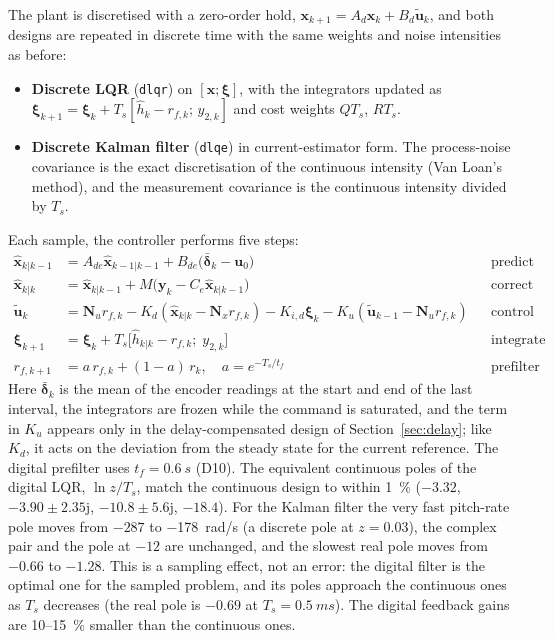 \documentclass[11pt,a4paper]{article}
\begin{document}
The plant is discretised with a zero-order hold,
$\bm x_{k+1}=A_d\bm x_k+B_d\tilde{\bm u}_k$, and both designs are repeated in
discrete time with the same weights and noise intensities as before:
\begin{itemize}
\item \textbf{Discrete LQR} (\texttt{dlqr}) on $[\bm x;\bm\xi]$, with the
      integrators updated as $\bm\xi_{k+1}=\bm\xi_k+T_s[\hat h_k-r_{f,k};\,y_{2,k}]$
      and cost weights $QT_s$, $RT_s$.
\item \textbf{Discrete Kalman filter} (\texttt{dlqe}) in current-estimator form.
      The process-noise covariance is the exact discretisation of the continuous
      intensity (Van Loan's method), and the measurement covariance is the
      continuous intensity divided by $T_s$.
\end{itemize}
Each sample, the controller performs five steps:
\begin{align*}
\hat{\bm x}_{k|k-1} &= A_{de}\hat{\bm x}_{k-1|k-1}+B_{de}\bigl(\bar{\bm\delta}_{k}-\bm u_0\bigr)
  && \text{predict}\\
\hat{\bm x}_{k|k} &= \hat{\bm x}_{k|k-1}+M\bigl(\bm y_k-C_e\hat{\bm x}_{k|k-1}\bigr)
  && \text{correct}\\
\tilde{\bm u}_k &= \bm N_u r_{f,k}-K_d(\hat{\bm x}_{k|k}-\bm N_x r_{f,k})-K_{i,d}\bm\xi_k-K_u(\tilde{\bm u}_{k-1}-\bm N_u r_{f,k})
  && \text{control law}\\
\bm\xi_{k+1} &= \bm\xi_k+T_s\bigl[\hat h_{k|k}-r_{f,k};\;y_{2,k}\bigr]
  && \text{integrate}\\
r_{f,k+1} &= a\,r_{f,k}+(1-a)\,r_k,\quad a=e^{-T_s/t_f}
  && \text{prefilter}
\end{align*}
Here $\bar{\bm\delta}_k$ is the mean of the encoder readings at the start and
end of the last interval, the integrators are frozen while the command is
saturated, and the term in $K_u$ appears only in the delay-compensated design
of Section~\ref{sec:delay}; like $K_d$, it acts on the deviation from the steady
state for the current reference. The digital prefilter uses
$t_f=\SI{0.6}{s}$ (D10). The equivalent continuous poles of the digital LQR,
$\ln z/T_s$, match the continuous design to within \SI{1}{\percent}
($-3.32$, $-3.90\pm2.35\mathrm{j}$, $-10.8\pm5.6\mathrm{j}$, $-18.4$). For the
Kalman filter the very fast pitch-rate pole moves from $-287$ to
\SI{-178}{rad/s} (a discrete pole at $z=0.03$), the complex pair and the pole at
$-12$ are unchanged, and the slowest real pole moves from $-0.66$ to $-1.28$.
This is a sampling effect, not an error: the digital filter is the optimal one
for the sampled problem, and its poles approach the continuous ones as $T_s$
decreases (the real pole is $-0.69$ at $T_s=\SI{0.5}{ms}$).
The digital feedback gains are 10--\SI{15}{\percent} smaller than the continuous
ones.
\end{document}
